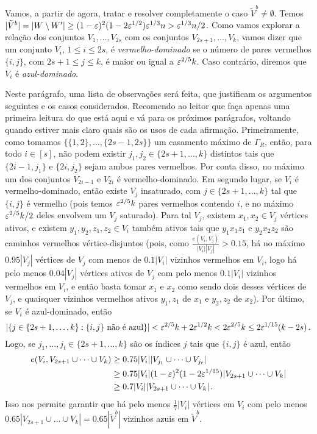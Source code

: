 Vamos, a partir de agora, tratar e resolver completamente o caso $\tilde{V}^b\neq \emptyset$. Temos $|\tilde{V}^b| = |W\setminus W'|\geq (1-\varepsilon)^2(1-2\varepsilon^{1/2})\varepsilon^{1/3}n > \varepsilon^{1/3}n/2$. Como vamos explorar a relação dos conjuntos $V_1,\dots,V_{2s}$ com os conjuntos $V_{2s+1},\dots,V_k$, vamos dizer que um conjunto $V_i$, $1\leq i\leq 2s$, é \emph{vermelho-dominado} se o número de pares vermelhos $\{i,j\}$, com $2s+1\leq j\leq k$, é maior ou igual a $\varepsilon^{2/5}k$. Caso contrário, diremos que $V_i$ é \emph{azul-dominado}.

Neste parágrafo, uma lista de observações será feita, que justificam os argumentos seguintes e os casos considerados. Recomendo ao leitor que faça apenas uma primeira leitura do que está aqui e vá para os próximos parágrafos, voltando quando estiver mais claro quais são os usos de cada afirmação. Primeiramente, como tomamos $\{\{1,2\},\dots,\{2s-1,2s\}\}$ um casamento máximo de $\Gamma_R$, então, para todo $i\in [s]$, não podem existir $j_1,j_2\in \{2s+1,\dots,k\}$ distintos tais que $\{2i-1,j_1\}$ e $\{2i, j_2\}$ sejam ambos pares vermelhos. Por conta disso, no máximo um dos conjuntos $V_{2i-1}$ e $V_{2i}$ é vermelho-dominado. Em segundo lugar, se $V_i$ é vermelho-dominado, então existe $V_j$ insaturado, com $j\in\{2s+1,\dots,k\}$ tal que $\{i,j\}$ é vermelho (pois temos $\varepsilon^{2/5}k$ pares vermelhos contendo $i$, e no máximo $\varepsilon^{2/5}k/2$ deles envolvem um $V_j$ saturado). Para tal $V_j$, existem $x_1, x_2\in V_j$ vértices ativos, e existem $y_1,y_2,z_1,z_2\in V_i$ também ativos tais que $y_1x_1z_1$ e $y_2x_2z_2$ são caminhos vermelhos vértice-disjuntos (pois, como $\frac{e(V_i,V_j)}{|V_i||V_j|}>0.15$, há no máximo $0.95|V_j|$ vértices de $V_j$ com menos de $0.1|V_i|$ vizinhos vermelhos em $V_i$, logo há pelo menos $0.04|V_j|$ vértices ativos de $V_j$ com pelo menos $0.1|V_i|$ vizinhos vermelhos em $V_i$, e então basta tomar $x_1$ e $x_2$ como sendo dois desses vértices de $V_j$, e quaisquer vizinhos vermelhos ativos $y_1,z_1$ de $x_1$ e $y_2,z_2$ de $x_2$). Por último, se $V_i$ é azul-dominado, então
\[
	|\{j\in\{2s+1,\dots,k\}: \{i,j\} \text{ não é azul}\}| < \varepsilon^{2/5}k + 2\varepsilon^{1/2}k < 2\varepsilon^{2/5}k \leq 2\varepsilon^{1/15}(k-2s)\,. 
\]
Logo, se $j_1,\dots,j_t\in\{2s+1,\dots,k\}$ são os índices $j$ tais que $\{i,j\}$ é azul, então
\begin{align*}
	e(V_i, V_{2s+1}\cup\dots\cup V_k)&\geq 0.75|V_i||V_{j_1}\cup\dots\cup V_{j_t}|\\
	&\geq 0.75|V_i|(1-\varepsilon)^2(1-2\varepsilon^{1/15})|V_{2s+1}\cup\dots\cup V_k|\\
	&\geq 0.7|V_i||V_{2s+1}\cup\dots\cup V_k|\,.
\end{align*}
Isso nos permite garantir que há pelo menos $\frac{1}{7}|V_i|$ vértices em $V_i$ com pelo menos $0.65|V_{2s+1}\cup\dots\cup V_k| = 0.65|\tilde{V}^b|$ vizinhos azuis em $\tilde{V}^b$.

